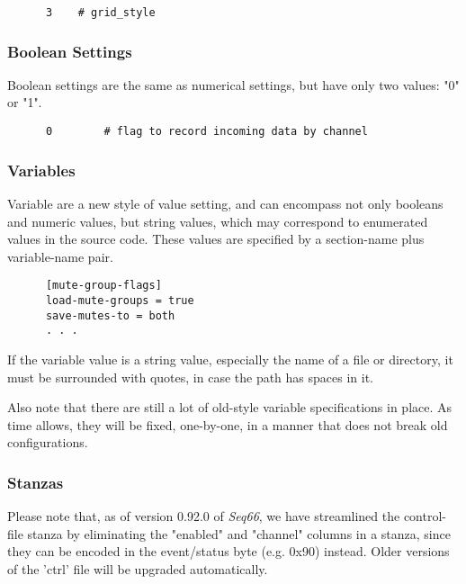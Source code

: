    \begin{verbatim}
      3    # grid_style
   \end{verbatim}

\subsubsection{Boolean Settings}
\label{subsec:configuration_common_boolean_settings}

   Boolean settings are the same as numerical settings, but have only
   two values: "0" or "1".

   \begin{verbatim}
      0        # flag to record incoming data by channel
   \end{verbatim}

\subsubsection{Variables}
\label{subsec:configuration_common_variables}

   Variable are a new style of value setting, and can encompass not only
   booleans and numeric values, but string values, which may correspond to
   enumerated values in the source code.  These values are specified by a
   section-name plus variable-name pair.

   \begin{verbatim}
      [mute-group-flags]
      load-mute-groups = true
      save-mutes-to = both
      . . .
   \end{verbatim}

   If the variable value is a string value, especially the name of a file or
   directory, it must be surrounded with quotes, in case the path has spaces
   in it.

   Also note that there are still a lot of old-style variable specifications in
   place.  As time allows, they will be fixed, one-by-one, in a manner that
   does not break old configurations.

\subsubsection{Stanzas}
\label{subsec:configuration_common_stanzas}

   Please note that, as of version 0.92.0 of \textsl{Seq66}, we have
   streamlined the control-file stanza by eliminating the "enabled" and
   "channel" columns in a stanza, since they can be encoded in the event/status
   byte (e.g. 0x90) instead.  Older versions of the 'ctrl' file will be
   upgraded automatically.

